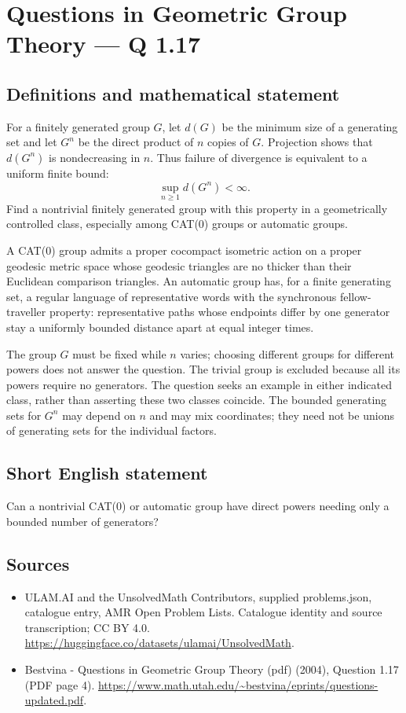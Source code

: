 \documentclass[11pt,a4paper]{article}
\begin{document}
\section*{Questions in Geometric Group Theory — Q 1.17}\label{statement}

\subsection{Definitions and mathematical statement}
For a finitely generated group $G$, let $d(G)$ be the minimum size of a generating set and let $G^n$ be the direct product of $n$ copies of $G$. Projection shows that $d(G^n)$ is nondecreasing in $n$. Thus failure of divergence is equivalent to a uniform finite bound:
\[
 \sup_{n\geq1}d(G^n)<\infty.
\]
Find a nontrivial finitely generated group with this property in a geometrically controlled class, especially among CAT(0) groups or automatic groups.

A CAT(0) group admits a proper cocompact isometric action on a proper geodesic metric space whose geodesic triangles are no thicker than their Euclidean comparison triangles. An automatic group has, for a finite generating set, a regular language of representative words with the synchronous fellow-traveller property: representative paths whose endpoints differ by one generator stay a uniformly bounded distance apart at equal integer times.

The group $G$ must be fixed while $n$ varies; choosing different groups for different powers does not answer the question. The trivial group is excluded because all its powers require no generators. The question seeks an example in either indicated class, rather than asserting these two classes coincide. The bounded generating sets for $G^n$ may depend on $n$ and may mix coordinates; they need not be unions of generating sets for the individual factors.
\subsection{Short English statement}
Can a nontrivial CAT(0) or automatic group have direct powers needing only a bounded number of generators?
\subsection{Sources}
\begin{itemize}
\item[S1] ULAM.AI and the UnsolvedMath Contributors, supplied problems.json, catalogue entry, AMR Open Problem Lists. Catalogue identity and source transcription; CC BY 4.0.
\url{https://huggingface.co/datasets/ulamai/UnsolvedMath}.
\item[S2] Bestvina - Questions in Geometric Group Theory (pdf) (2004), Question 1.17 (PDF page 4). 
\url{https://www.math.utah.edu/~bestvina/eprints/questions-updated.pdf}.
\end{itemize}
\end{document}
